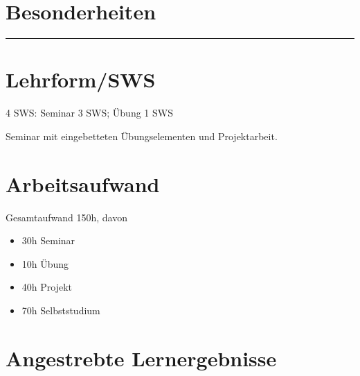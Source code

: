 \hypertarget{besonderheitenpathlabel....srcmodulbeschreibungen-bachelor-bpo5ba_einfhrungindiemedieninformatik}{%
\section*{Besonderheiten\label{../../src/modulbeschreibungen-bachelor-bpo5/BA_EinfhrungindieMedieninformatik}}\label{besonderheitenpathlabel....srcmodulbeschreibungen-bachelor-bpo5ba_einfhrungindiemedieninformatik}}

\begin{center}\rule{0.5\linewidth}{0.5pt}\end{center}

\hypertarget{lehrformswspathlabel....srcmodulbeschreibungen-bachelor-bpo5ba_einfhrungindiemedieninformatik}{%
\section*{Lehrform/SWS\label{../../src/modulbeschreibungen-bachelor-bpo5/BA_EinfhrungindieMedieninformatik}}\label{lehrformswspathlabel....srcmodulbeschreibungen-bachelor-bpo5ba_einfhrungindiemedieninformatik}}

4 SWS: Seminar 3 SWS; Übung 1 SWS

Seminar mit eingebetteten Übungselementen und Projektarbeit.

\hypertarget{arbeitsaufwandpathlabel....srcmodulbeschreibungen-bachelor-bpo5ba_einfhrungindiemedieninformatik}{%
\section*{Arbeitsaufwand\label{../../src/modulbeschreibungen-bachelor-bpo5/BA_EinfhrungindieMedieninformatik}}\label{arbeitsaufwandpathlabel....srcmodulbeschreibungen-bachelor-bpo5ba_einfhrungindiemedieninformatik}}

Gesamtaufwand 150h, davon

\begin{itemize}
\tightlist
\item
  30h Seminar
\item
  10h Übung
\item
  40h Projekt
\item
  70h Selbststudium
\end{itemize}

\hypertarget{angestrebte-lernergebnissepathlabel....srcmodulbeschreibungen-bachelor-bpo5ba_einfhrungindiemedieninformatik}{%
\section*{Angestrebte
Lernergebnisse\label{../../src/modulbeschreibungen-bachelor-bpo5/BA_EinfhrungindieMedieninformatik}}\label{angestrebte-lernergebnissepathlabel....srcmodulbeschreibungen-bachelor-bpo5ba_einfhrungindiemedieninformatik}}

